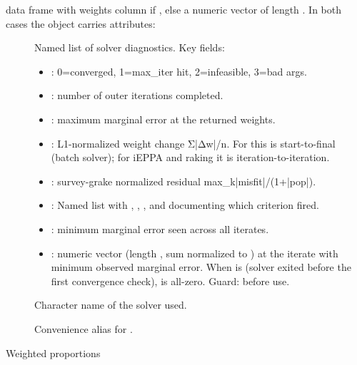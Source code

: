 \documentclass[a4paper]{book}
\begin{document}
%
\begin{Value}
data frame with weights column if , else a numeric
vector of length . In both cases the object carries attributes:
\begin{description}

\item[] Named list of solver diagnostics. Key fields:
\begin{itemize}

\item{} : 0=converged, 1=max\_iter hit, 2=infeasible, 3=bad args.
\item{} : number of outer iterations completed.
\item{} : maximum marginal error at the returned weights.
\item{} : L1-normalized weight change Σ|Δw|/n.
For  this is start-to-final (batch solver);
for iEPPA and raking it is iteration-to-iteration.
\item{} : survey-grake normalized residual
max\_k|misfit|/(1+|pop|).
\item{} : Named list with , ,
, and  documenting which criterion fired.
\item{} : minimum marginal error seen across all iterates.
\item{} : numeric vector (length , sum normalized to
) at the iterate with minimum observed marginal error. When
 is  (solver exited before the first convergence
check),  is all-zero. Guard:
 before use.

\end{itemize}


\item[] Character name of the solver used.
\item[] Convenience alias for .

\end{description}

\end{Value}
%
\begin{Description}
Weighted proportions
\end{Description}
\end{document}
